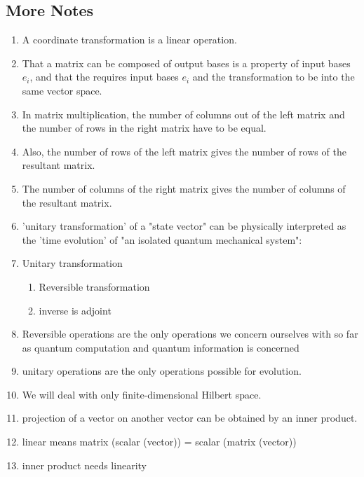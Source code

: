 \documentclass{article}
\begin{document}
\subsection{More Notes}

    \begin{enumerate}
    
    
    \item A coordinate transformation is a linear operation.
    \item That a matrix can be composed of output bases is a property of input bases $e_i$, and that the requires input bases $e_i$ and the transformation to be into the same vector space.
    
    
    
    \item In matrix multiplication, the number of columns out of the left matrix and the number of rows in the right matrix have to be equal.
    \item Also, the number of rows of the left matrix gives the number of rows of the resultant matrix.
    \item The number of columns of the right matrix gives the number of columns of the resultant matrix.

    
    \item 'unitary transformation' of a "state vector" can be physically interpreted as the 'time evolution' of "an isolated quantum mechanical system":
    \item Unitary transformation
    \begin{enumerate} %
        \item Reversible transformation
        \item inverse is adjoint
    \end{enumerate}

    \item Reversible operations are the only operations we concern ourselves with so far as quantum computation and quantum information is concerned
    \item unitary operations are the only operations possible for evolution.
    \item We will deal with only finite-dimensional Hilbert space.
    \item projection of a vector on another vector can be obtained by an inner product. 
    \item linear means matrix (scalar (vector)) = scalar (matrix (vector))
    \item inner product needs linearity 
    \end{enumerate}
\end{document}
